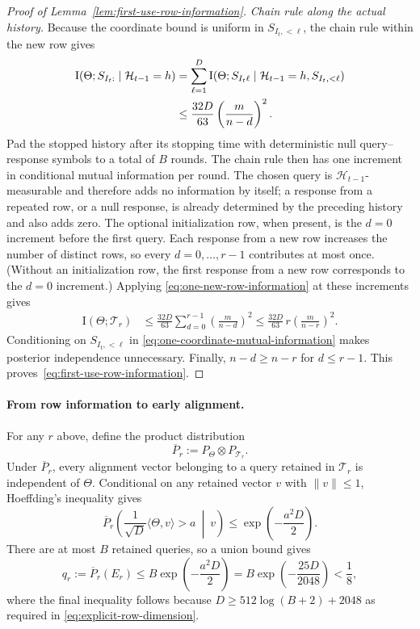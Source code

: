\documentclass{article}
\theoremstyle{definition}
\begin{document}
\begin{proof}[Proof of Lemma~\ref{lem:first-use-row-information}]
\emph{Chain rule along the actual history.}
Because the coordinate bound is uniform in $S_{I_t,<\ell}$, the chain rule
within the new row gives
\begin{align}
 \mathrm I(\Theta;S_{I_t:}\mid\mathcal H_{t-1}=h)
 &=\sum_{\ell=1}^D
   \mathrm I(\Theta;S_{I_t\ell}
   \mid\mathcal H_{t-1}=h,S_{I_t,<\ell})
   \notag\\
 &\le \frac{32D}{63}\left(\frac{m}{n-d}\right)^2.
 \label{eq:one-new-row-information}
\end{align}
Pad the stopped history after its stopping time with deterministic null
query--response symbols to a total of $B$ rounds.  The chain rule then has one
increment in conditional mutual information per round.  The chosen query is
$\mathcal H_{t-1}$-measurable and therefore adds no information by itself; a
response from a repeated row, or a null response, is already determined by the
preceding history and also adds zero.
The optional initialization row, when present, is the $d=0$ increment before
the first query.  Each response from a new row increases the number of distinct rows, so
every $d=0,\ldots,r-1$ contributes at most once.  (Without an initialization
row, the first response from a new row corresponds to the $d=0$ increment.)  Applying
\eqref{eq:one-new-row-information} at these increments gives
\begin{align*}
 \mathrm I(\Theta;\mathcal T_r)
 &\le \frac{32D}{63}
 \sum_{d=0}^{r-1}\left(\frac{m}{n-d}\right)^2
 \le \frac{32D}{63}\,
 r\left(\frac{m}{n-r}\right)^2.
\end{align*}
Conditioning on $S_{I_t,<\ell}$ in
\eqref{eq:one-coordinate-mutual-information} makes posterior independence
unnecessary.  Finally, $n-d\ge n-r$ for $d\le r-1$.  This
proves~\eqref{eq:first-use-row-information}.
\end{proof}

\paragraph{From row information to early alignment.}
For any $r$ above, define the product distribution
\[
 \overline P_r:=P_\Theta\otimes P_{\mathcal T_r}.
\]
Under $\overline P_r$, every alignment vector belonging to a query retained in
$\mathcal T_r$ is independent of $\Theta$.  Conditional on any retained vector
$v$ with $\|v\|\le1$, Hoeffding's inequality gives
\[
 \overline P_r\!\left(
  \frac1{\sqrt D}\langle\Theta,v\rangle>a\ \middle|\ v
 \right)
 \le \exp\!\left(-\frac{a^2D}{2}\right).
\]
There are at most $B$ retained queries, so a union bound gives
\begin{equation}
q_r:=\overline P_r(E_r)
 \le B\exp\!\left(-\frac{a^2D}{2}\right)
 =B\exp\!\left(-\frac{25D}{2048}\right)
 <\frac18,
 \label{eq:product-alignment-tail}
\end{equation}
where the final inequality follows because
$D\ge512\log(B+2)+2048$ as required in
\eqref{eq:explicit-row-dimension}.
\end{document}
